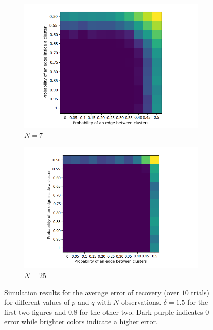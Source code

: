 \documentclass[12pt]{amsart}
\theoremstyle{remark}
\begin{document}
\begin{figure}
\begin{subfigure}[b]{0.5\textwidth}
         \includegraphics[width=\textwidth]{./Pictures/Variapq7.PNG}
         \caption{$N = 7$}
     \end{subfigure}
     \hfill
     \begin{subfigure}[b]{0.5\textwidth}
         \centering
         \includegraphics[width=\textwidth]{./Pictures/Variapq25.PNG}
         \caption{$N = 25$}
     \end{subfigure}
        \caption{Simulation results for the average error of recovery (over $10$ trials) for different values of $p$ and $q$ with $N$ observations. $\delta = 1.5$ for the first two figures and $0.8$ for the other two. Dark purple indicates 0 error while brighter colors indicate a higher error.}
        \label{fig:Variapq}
\end{figure}
\end{document}
